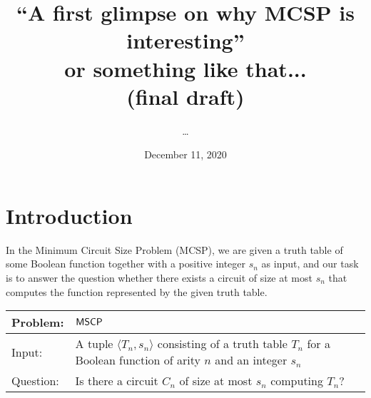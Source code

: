 \documentclass[11pt]{article}
\author{\dots}
\title{``A first glimpse on why MCSP is interesting''\\ or something like that... \\ \smallskip \normalsize{(final draft)}}
\date{December 11, 2020}
\begin{document}
	\maketitle
	
\section{Introduction}

In the Minimum Circuit Size Problem (MCSP), we are given a truth table of some Boolean function together with a positive integer $s_n$ as input, and our task is to answer the question whether there exists a circuit of size at most $s_n$ that computes the function represented by the given truth table.

{
	\renewcommand{\arraystretch}{1.5}
	\begin{center}
		\begin{tabular}{|p{2cm}p{11cm}|}
			\hline
			Problem:
			&
			$\mathsf{MSCP}$
			\\
			\hline
			Input:
			&
			A tuple $\langle T_n, s_n \rangle$ consisting of a truth table $T_n$ for
			a Boolean function of arity $n$ and an integer $s_n$
			\\
			Question: & Is there a circuit $C_n$ of size at most $s_n$ computing $T_n$?
			\\
			\hline
		\end{tabular}
	\end{center}
}
\end{document}
